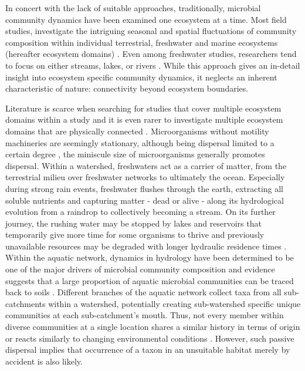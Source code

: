 \documentclass[12pt,a4paper]{article} %
\begin{document}
In concert with the lack of suitable approaches, traditionally, microbial community dynamics have been examined one ecosystem at a time. Most field studies, investigate the intriguing seasonal and spatial fluctuations of community composition within individual terrestrial, freshwater and marine ecosystems (hereafter ecosystem domains) \citep{Shigyo2019,Jones2012,Hassell2018,Giovannoni2012}. Even among freshwater studies, researchers tend to focus on either streams, lakes, or rivers \citep{Logue2008}. While this approach gives an in-detail insight into ecosystem specific community dynamics, it neglects an inherent characteristic of nature: connectivity beyond ecosystem boundaries.

Literature is scarce when searching for studies that cover multiple ecosystem domains within a study \citep{Nemergut2011, Shade2013} and it is even rarer to investigate multiple ecosystem domains that are physically connected \citep{Ruiz-Gonzalez2015, Hauptmann2016, Doherty2017, Gweon2020}. Microorganisms without motility machineries are seemingly stationary, although being dispersal limited to a certain degree \citep{Hanson2012}, the miniscule size of microorganisms generally promotes dispersal. Within a watershed, freshwaters act as a carrier of matter, from the terrestrial milieu over freshwater networks to ultimately the ocean. Especially during strong rain events, freshwater flushes through the earth, extracting all soluble nutrients and capturing matter - dead or alive - along its hydrological evolution from a raindrop to collectively becoming a stream. On its further journey, the rushing water may be stopped by lakes and reservoirs that temporarily give more time for some organisms to thrive and previously unavailable resources may be degraded with longer hydraulic residence times \citep{Catalan2016a}. Within the aquatic network, dynamics in hydrology have been determined to be one of the major drivers of microbial community composition \citep{Nino-Garcia2016} and evidence suggests that a large proportion of aquatic microbial communities can be traced back to soils \citep{Crump2012, Besemer2013, Ruiz-Gonzalez2015, Hauptmann2016}. Different branches of the aquatic network collect taxa from all sub-catchments within a watershed, potentially creating sub-watershed specific unique communities at each sub-catchment's mouth. Thus, not every member within diverse communities at a single location shares a similar history in terms of origin \citep{Nino-Garcia2016, Comte2017} or reacts similarly to changing environmental conditions \citep{Fierer2007}. However, such passive dispersal implies that occurrence of a taxon in an unsuitable habitat merely by accident is also likely.
\end{document}
